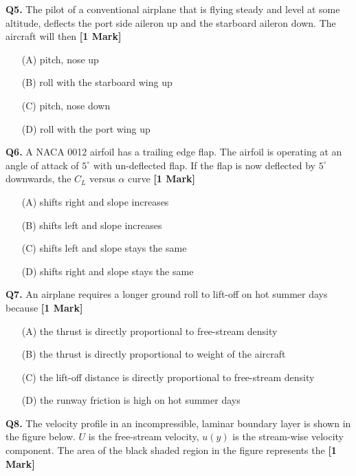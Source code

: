 \documentclass[11pt]{article}
\newcommand{\questiona}[2]{
    \noindent\textbf{Q#2.} #1 \hfill \textbf{[1 Mark]}
}
\begin{document}
\vspace{0.5cm}

\questiona{The pilot of a conventional airplane that is flying steady and level at some altitude, deflects the port side aileron up and the starboard aileron down. The aircraft will then}{5}
\begin{enumerate}
    \item[(A)] pitch, nose up  
    \item[(B)] roll with the starboard wing up  
    \item[(C)] pitch, nose down  
    \item[(D)] roll with the port wing up  
\end{enumerate}

\vspace{0.5cm}

\questiona{A NACA 0012 airfoil has a trailing edge flap. The airfoil is operating at an angle of attack of $5^\circ$ with un-deflected flap. If the flap is now deflected by $5^\circ$ downwards, the $C_L$ versus $\alpha$ curve}{6}
\begin{enumerate}
    \item[(A)] shifts right and slope increases  
    \item[(B)] shifts left and slope increases  
    \item[(C)] shifts left and slope stays the same  
    \item[(D)] shifts right and slope stays the same  
\end{enumerate}

\vspace{0.5cm}

\questiona{An airplane requires a longer ground roll to lift-off on hot summer days because}{7}
\begin{enumerate}
    \item[(A)] the thrust is directly proportional to free-stream density  
    \item[(B)] the thrust is directly proportional to weight of the aircraft  
    \item[(C)] the lift-off distance is directly proportional to free-stream density  
    \item[(D)] the runway friction is high on hot summer days  
\end{enumerate}

\vspace{0.5cm}

\questiona{The velocity profile in an incompressible, laminar boundary layer is shown in the figure below. $U$ is the free-stream velocity, $u(y)$ is the stream-wise velocity component. The area of the black shaded region in the figure represents the}{8}
\end{document}
